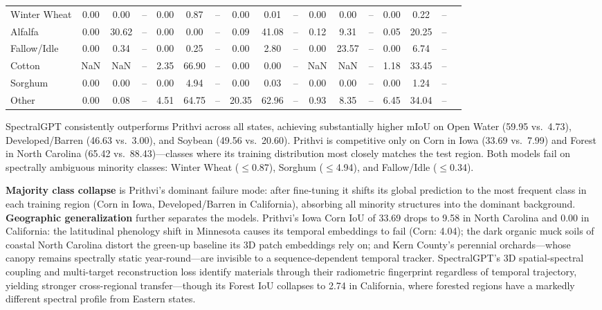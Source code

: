 \documentclass[sigconf, nonacm]{acmart}
\begin{document}
\begin{table}[t]
{\begin{tabular}{lcccccccccccccccc}
Winter Wheat       & 0.00  & 0.00  & -- & 0.00  & 0.87  & -- & 0.00  & 0.01  & -- & 0.00  & 0.00  & -- & 0.00  & 0.22  & -- \\
Alfalfa            & 0.00  & 30.62 & -- & 0.00  & 0.00  & -- & 0.09  & 41.08 & -- & 0.12  & 9.31  & -- & 0.05  & 20.25 & -- \\
Fallow/Idle        & 0.00  & 0.34  & -- & 0.00  & 0.25  & -- & 0.00  & 2.80  & -- & 0.00  & 23.57 & -- & 0.00  & 6.74  & -- \\
Cotton             & NaN   & NaN   & -- & 2.35  & 66.90 & -- & 0.00  & 0.00  & -- & NaN   & NaN   & -- & 1.18  & 33.45 & -- \\
Sorghum            & 0.00  & 0.00  & -- & 0.00  & 4.94  & -- & 0.00  & 0.03  & -- & 0.00  & 0.00  & -- & 0.00  & 1.24  & -- \\
Other              & 0.00  & 0.08  & -- & 4.51  & 64.75 & -- & 20.35 & 62.96 & -- & 0.93  & 8.35  & -- & 6.45  & 34.04 & -- \\
\bottomrule
\end{tabular}}
\end{table}

SpectralGPT consistently outperforms Prithvi across all
states, achieving substantially higher mIoU on Open Water
(59.95 vs.\ 4.73), Developed/Barren (46.63 vs.\ 3.00), and
Soybean (49.56 vs.\ 20.60). Prithvi is competitive only on
Corn in Iowa (33.69 vs.\ 7.99) and Forest in North Carolina
(65.42 vs.\ 88.43)---classes where its training distribution
most closely matches the test region. Both models fail on
spectrally ambiguous minority classes: Winter Wheat
($\leq$0.87), Sorghum ($\leq$4.94), and Fallow/Idle
($\leq$0.34).

\textbf{Majority class collapse} is Prithvi's dominant
failure mode: after fine-tuning it shifts its global
prediction to the most frequent class in each training
region (Corn in Iowa, Developed/Barren in California),
absorbing all minority structures into the dominant
background. \textbf{Geographic generalization} further
separates the models. Prithvi's Iowa Corn IoU of 33.69
drops to 9.58 in North Carolina and 0.00 in California:
the latitudinal phenology shift in Minnesota causes its
temporal embeddings to fail (Corn: 4.04); the dark organic
muck soils of coastal North Carolina distort the green-up
baseline its 3D patch embeddings rely on; and Kern County's
perennial orchards---whose canopy remains spectrally
static year-round---are invisible to a sequence-dependent
temporal tracker. SpectralGPT's 3D spatial-spectral
coupling and multi-target reconstruction loss identify
materials through their radiometric fingerprint regardless
of temporal trajectory, yielding stronger cross-regional
transfer---though its Forest IoU collapses to 2.74 in
California, where forested regions have a markedly different
spectral profile from Eastern states.
\end{document}
